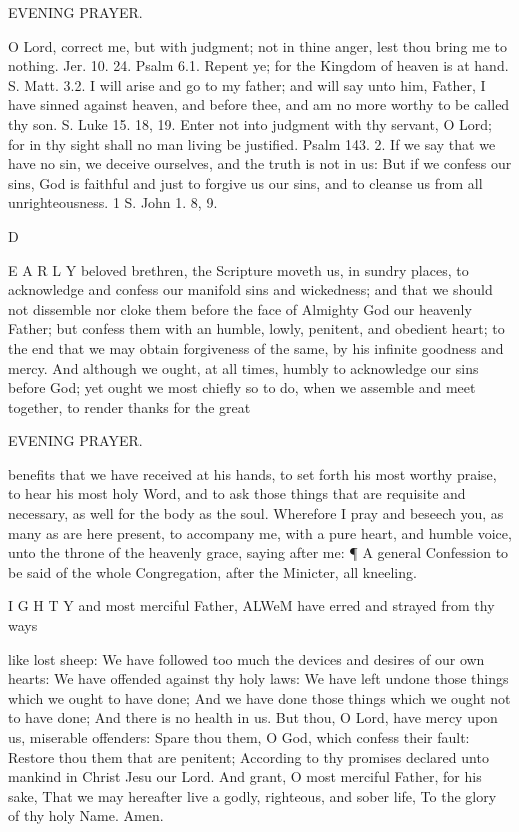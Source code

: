 EVENING PRAYER.

O Lord, correct me, but with judgment; not in thine anger, lest thou bring me to nothing. Jer. 10. 24. Psalm 6.1. Repent ye; for the Kingdom of heaven is at hand. S. Matt. 3.2. I will arise and go to my father; and will say unto him, Father, I have sinned against heaven, and before thee, and am no more worthy to be called thy son. S. Luke 15. 18, 19. Enter not into judgment with thy servant, O Lord; for in thy sight shall no man living be justified. Psalm 143. 2. If we say that we have no sin, we deceive ourselves, and the truth is not in us: But if we confess our sins, God is faithful and just to forgive us our sins, and to cleanse us from all unrighteousness. 1 S. John 1. 8, 9.

D

E A R L Y beloved brethren, the Scripture moveth us, in sundry places, to acknowledge and confess our manifold sins and wickedness; and that we should not dissemble nor cloke them before the face of Almighty God our heavenly Father; but confess them with an humble, lowly, penitent, and obedient heart; to the end that we may obtain forgiveness of the same, by his infinite goodness and mercy. And although we ought, at all times, humbly to acknowledge our sins before God; yet ought we most chiefly so to do, when we assemble and meet together, to render thanks for the great

EVENING PRAYER.

benefits that we have received at his hands, to set forth his most worthy praise, to hear his most holy Word, and to ask those things that are requisite and necessary, as well for the body as the soul. Wherefore I pray and beseech you, as many as are here present, to accompany me, with a pure heart, and humble voice, unto the throne of the heavenly grace, saying after me: ¶ A general Confession to be said of the whole Congregation, after the Minicter, all kneeling.

I G H T Y and most merciful Father, ALWeM have erred and strayed from thy ways

like lost sheep: We have followed too much the devices and desires of our own hearts: We have offended against thy holy laws: We have left undone those things which we ought to have done; And we have done those things which we ought not to have done; And there is no health in us. But thou, O Lord, have mercy upon us, miserable offenders: Spare thou them, O God, which confess their fault: Restore thou them that are penitent; According to thy promises declared unto mankind in Christ Jesu our Lord. And grant, O most merciful Father, for his sake, That we may hereafter live a godly, righteous, and sober life, To the glory of thy holy Name. Amen.

